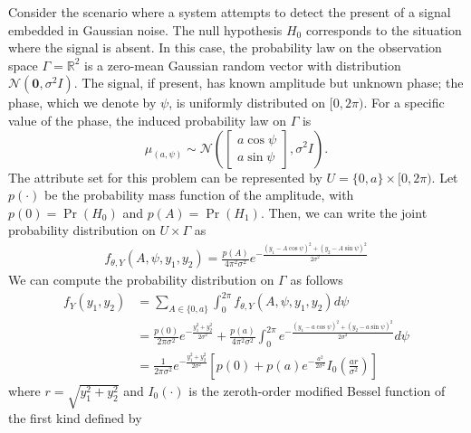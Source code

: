 \begin{example}
Consider the scenario where a system attempts to detect the present of a signal embedded in Gaussian noise.
The null hypothesis $H_0$ corresponds to the situation where the signal is absent.
In this case, the probability law on the observation space $\Gamma = \mathbb{R}^2$ is a zero-mean Gaussian random vector with distribution $\mathcal{N}(\mathbf{0}, \sigma^2 I)$.
The signal, if present, has known amplitude but unknown phase;
the phase, which we denote by $\psi$, is uniformly distributed on $[0, 2 \pi)$.
For a specific value of the phase, the induced probability law on $\Gamma$ is
\begin{equation*}
\mu_{(a,\psi)} \sim \mathcal{N} \left( \left[ \begin{array}{c} a \cos \psi \\ a \sin \psi \end{array} \right], \sigma^2 I \right) .
\end{equation*}
The attribute set for this problem can be represented by $U = \{ 0, a \} \times [0, 2 \pi)$.
Let $p(\cdot)$ be the probability mass function of the amplitude, with $p(0) = \Pr (H_0)$ and $p(A) = \Pr (H_1)$.
Then, we can write the joint probability distribution on $U \times \Gamma$ as
\begin{equation*}
\begin{split}
f_{\theta, Y} ( A,\psi, y_1, y_2 )
= \frac{p(A)}{4 \pi^2 \sigma^2}
e^{- \frac{(y_1 - A \cos \psi)^2 + (y_2 - A \sin \psi)^2}{2 \sigma^2} }
\end{split}
\end{equation*}
We can compute the probability distribution on $\Gamma$ as follows
\begin{equation*}
\begin{split}
f_Y ( y_1, y_2 ) &= \sum_{A \in \{ 0, a \}} \int_0^{2 \pi} 
f_{\theta, Y} ( A,\psi, y_1, y_2 ) d\psi \\
&= \frac{ p(0) }{2 \pi \sigma^2}
e^{- \frac{y_1^2 + y_2^2}{2 \sigma^2} }
+ \frac{ p(a) }{4 \pi^2 \sigma^2} \int_0^{2 \pi}
e^{- \frac{(y_1 - a \cos \psi)^2 + (y_2 - a \sin \psi)^2}{2 \sigma^2} }
d\psi \\
&= \frac{1}{2 \pi \sigma^2} e^{- \frac{y_1^2 + y_2^2}{2 \sigma^2} }
\left[ p(0) + p(a) e^{- \frac{a^2}{2 \sigma^2}}
I_0 \left( \frac{a r}{\sigma^2} \right) \right]
\end{split}
\end{equation*}
where $r = \sqrt{ y_1^2 + y_2^2 }$ and $I_0 (\cdot)$ is the zeroth-order modified Bessel function of the first kind defined by

\end{example}
